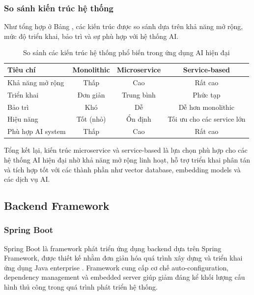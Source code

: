 \subsubsection{So sánh kiến trúc hệ thống}

Như tổng hợp ở Bảng , các kiến trúc được so sánh dựa trên khả năng mở rộng, mức độ triển khai, bảo trì và sự phù hợp với hệ thống AI.

\begin{table}[H]
\centering
\caption{So sánh các kiến trúc hệ thống phổ biến trong ứng dụng AI hiện đại}
\label{tab:architecture_comparison}
\renewcommand{\arraystretch}{1.3}

\begin{tabular}{@{}lccc@{}}
\toprule
\textbf{Tiêu chí} & \textbf{Monolithic} & \textbf{Microservice} & \textbf{Service-based} \\
\midrule
Khả năng mở rộng & Thấp & Cao & Rất cao \\
Triển khai & Đơn giản & Trung bình & Phức tạp \\
Bảo trì & Khó & Dễ & Dễ hơn monolithic \\
Hiệu năng & Tốt (nhỏ) & Ổn định & Tối ưu cho các service lớn \\
Phù hợp AI system & Thấp & Cao & Rất cao \\
\bottomrule
\end{tabular}
\end{table}

Tổng kết lại, kiến trúc microservice và service-based là lựa chọn phù hợp cho các hệ thống AI hiện đại nhờ khả năng mở rộng linh hoạt, hỗ trợ triển khai phân tán và tích hợp tốt với các thành phần như vector database, embedding models và các dịch vụ AI.
\subsection{Backend Framework}
\subsubsection{Spring Boot}

Spring Boot là framework phát triển ứng dụng backend dựa trên Spring Framework, được thiết kế nhằm đơn giản hóa quá trình xây dựng và triển khai ứng dụng Java enterprise \parencite{springbootdocs2024}. Framework cung cấp cơ chế auto-configuration, dependency management và embedded server giúp giảm đáng kể khối lượng cấu hình thủ công trong quá trình phát triển hệ thống.

